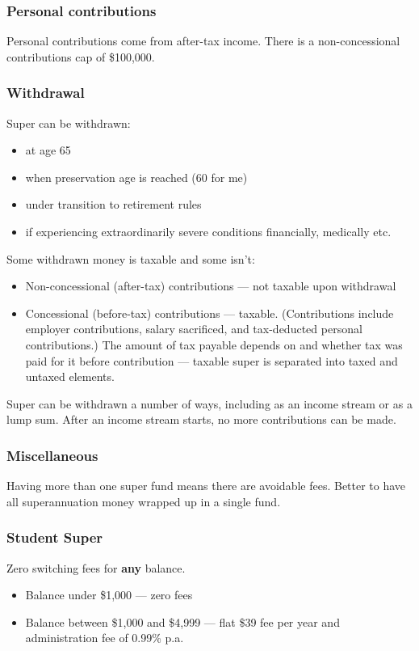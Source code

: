 \subsubsection{Personal contributions}
Personal contributions come from after-tax income. There is a non-concessional contributions cap of \$100,000.

\subsubsection{Withdrawal}
Super can be withdrawn:
\begin{itemize}
	\item at age 65
	\item when preservation age is reached (60 for me)
	\item under transition to retirement rules
	\item if experiencing extraordinarily severe conditions financially, medically etc.
\end{itemize}
Some withdrawn money is taxable and some isn't:
\begin{itemize}
	\item Non-concessional (after-tax) contributions --- not taxable upon withdrawal
	\item Concessional (before-tax) contributions --- taxable. (Contributions include employer contributions, salary sacrificed, and tax-deducted personal contributions.) The amount of tax payable depends on and whether tax was paid for it before contribution --- taxable super is separated into taxed and untaxed elements.
\end{itemize}
Super can be withdrawn a number of ways, including as an income stream or as a lump sum. After an income stream starts, no more contributions can be made.

\subsubsection{Miscellaneous}
Having more than one super fund means there are avoidable fees. Better to have all superannuation money wrapped up in a single fund.

\subsubsection{Student Super}
Zero switching fees for \textbf{any} balance.
\begin{itemize}
	\item Balance under \$1,000 --- zero fees
	\item Balance between \$1,000 and \$4,999 --- flat \$39 fee per year and administration fee of 0.99\% p.a.
\end{itemize}

